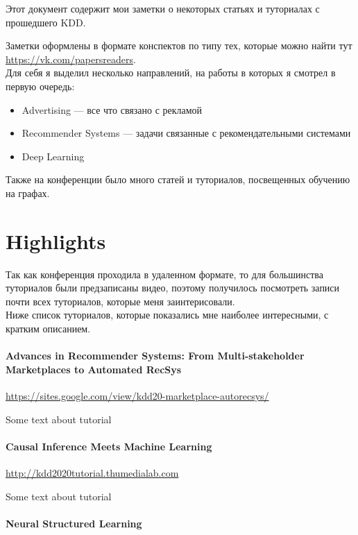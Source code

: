 Этот документ содержит мои заметки о некоторых статьях и туториалах с прошедшего KDD.

Заметки оформлены в формате конспектов по типу тех, которые можно найти тут \url{https://vk.com/papersreaders}. \\

Для себя я выделил несколько направлений, на работы в которых я смотрел в первую очередь:
\begin{itemize}
    \item Advertising --- все что связано с рекламой
    \item Recommender Systems --- задачи связанные с рекомендательными системами
    \item Deep Learning
\end{itemize}

Также на конференции было много статей и туториалов, посвещенных обучению на графах.

\section*{Highlights}

Так как конференция проходила в удаленном формате, то для большинства туториалов были предзаписаны видео, поэтому получилось посмотреть записи почти всех туториалов, которые меня заинтерисовали. \\

Ниже список туториалов, которые показались мне наиболее интересными, с кратким описанием.

\paragraph{Advances in Recommender Systems: From Multi-stakeholder Marketplaces to Automated RecSys} $ $\\

\url{https://sites.google.com/view/kdd20-marketplace-autorecsys/}

Some text about tutorial

\paragraph{Causal Inference Meets Machine Learning} $ $\\

\url{http://kdd2020tutorial.thumedialab.com}

Some text about tutorial

\paragraph{Neural Structured Learning} $ $\\

